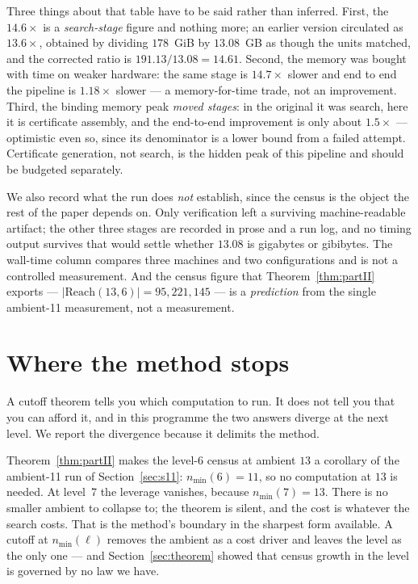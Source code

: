 \documentclass[11pt,a4paper]{article}
\theoremstyle{plain}
\theoremstyle{definition}
\theoremstyle{remark}
\newcommand{\Reach}{\mathrm{Reach}}
\newcommand{\nmin}{n_{\min}}
\begin{document}
Three things about that table have to be said rather than inferred. First, the
$14.6\times$ is a \emph{search-stage} figure and nothing more; an earlier
version circulated as $13.6\times$, obtained by dividing $178$~GiB by
$13.08$~GB as though the units matched, and the corrected ratio is
$191.13/13.08 = 14.61$. Second, the memory was bought with time on weaker
hardware: the same stage is $14.7\times$ slower and end to end the pipeline is
$1.18\times$ slower --- a memory-for-time trade, not an improvement. Third, the
binding memory peak \emph{moved stages}: in the original it was search, here it
is certificate assembly, and the end-to-end improvement is only about
$1.5\times$ --- optimistic even so, since its denominator is a lower bound from
a failed attempt. Certificate generation, not search, is the hidden peak of
this pipeline and should be budgeted separately.

We also record what the run does \emph{not} establish, since the census is the
object the rest of the paper depends on. Only verification left a surviving
machine-readable artifact; the other three stages are recorded in prose and a
run log, and no timing output survives that would settle whether $13.08$ is
gigabytes or gibibytes. The wall-time column compares three machines and two
configurations and is not a controlled measurement. And the census figure that
Theorem~\ref{thm:partII} exports --- $|\Reach(13,6)| = 95{,}221{,}145$ --- is a
\emph{prediction} from the single ambient-11 measurement, not a measurement.

\section{Where the method stops}\label{sec:boundary}

A cutoff theorem tells you which computation to run. It does not tell you that
you can afford it, and in this programme the two answers diverge at the next
level. We report the divergence because it delimits the method.

Theorem~\ref{thm:partII} makes the level-6 census at ambient $13$ a corollary
of the ambient-11 run of Section~\ref{sec:s11}: $\nmin(6) = 11$, so no
computation at $13$ is needed. At level~7 the leverage vanishes, because
$\nmin(7) = 13$. There is no smaller ambient to collapse to; the theorem is
silent, and the cost is whatever the search costs. That is the method's
boundary in the sharpest form available. A cutoff at $\nmin(\ell)$ removes the
ambient as a cost driver and leaves the level as the only one --- and
Section~\ref{sec:theorem} showed that census growth in the level is governed by
no law we have.
\end{document}
